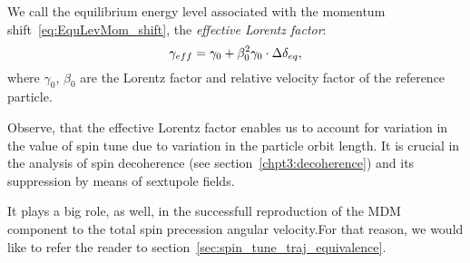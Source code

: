 We call the equilibrium energy level associated with the momentum shift~\eqref{eq:EquLevMom_shift},
the \emph{effective Lorentz factor}:
\begin{equation}\label{eq:EffectiveGamma}
\g*= \gamma_0 + \beta_0^2\gamma_0\cdot\Delta\delta_{eq},
\end{equation}
where $\gamma_0$, $\beta_0$ are the Lorentz factor and relative velocity factor of the reference particle.

Observe, that the effective Lorentz factor enables us to account for variation in the value of spin tune
due to variation in the particle orbit length. It is crucial in the analysis of
spin decoherence (see section~\ref{chpt3:decoherence}) and its suppression by means of sextupole fields.


It plays a big role, as well, in the successfull reproduction of the MDM component to the total spin precession
angular velocity.For that reason, we would like to refer the reader to section~\ref{sec:spin_tune_traj_equivalence}.
